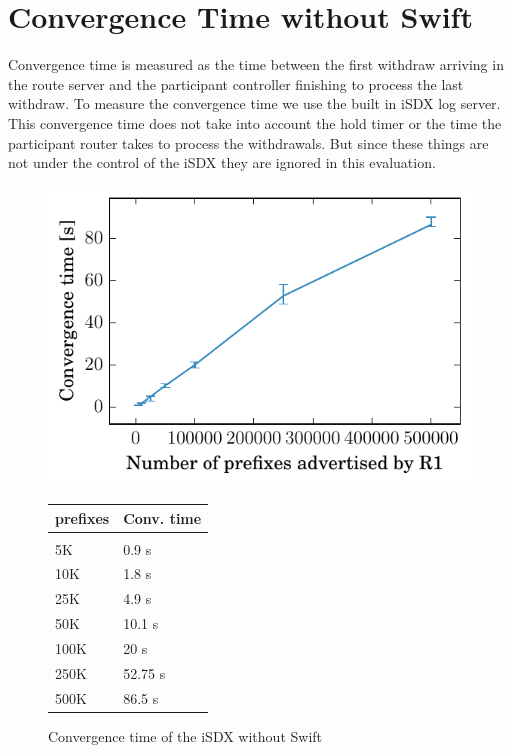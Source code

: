 \section{\label{chapter4:Convergence time without Swift}Convergence Time without Swift}

Convergence time is measured as the time between the first withdraw arriving in the route server and the participant controller finishing to process the last withdraw. To measure the convergence time we use the built in iSDX log server.\\
This convergence time does not take into account the hold timer or the time the participant router takes to process the withdrawals. But since these things are not under the control of the iSDX they are ignored in this evaluation.

\begin{figure}
\centering
\begin{minipage}[t]{.4\textwidth}
\centering
\vspace{0pt}
\includegraphics[scale = 1]{Figures/noswift.pdf}
\caption{Convergence time of the iSDX without Swift}
\label{fig:noswift}
\end{minipage}\hfill
\begin{minipage}[t]{.4\textwidth}
\centering
\vspace{0pt}
\begin{tabular}{@{}ll@{}}
	\\
	prefixes & Conv. time \\
	\hline
	\\
    5K & 0.9 s  \\
    10K & 1.8 s   \\
    25K & 4.9 s   \\
    50K & 10.1 s  \\
    100K & 20 s \\
    250K & 52.75 s   \\
    500K & 86.5 s  \\
\end{tabular}
\end{minipage}
\end{figure}

